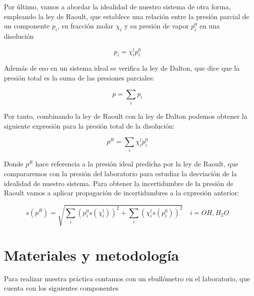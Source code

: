 \documentclass[a4paper,12pt,titlepage]{article}
\begin{document}
Por último, vamos a abordar la idealidad de nuestro sistema de otra forma, empleando la ley de Raoult, que establece una relación entre la presión parcial de un componente $p_i$, su fracción molar $\chi_i$ y su presión de vapor $p_i^0$ en una disolución

\begin{equation}
    p_i =\chi_i^l p_i^0  
\end{equation}

Además de eso en un sistema ideal se verifica la ley de Dalton, que dice que la presión total es la suma de las presiones parciales:

\begin{equation}
    p = \sum_i p_i
\end{equation}

Por tanto, combinando la ley de Raoult con la ley de Dalton podemos obtener la siguiente expresión para la presión total de la disolución:

\begin{equation}
    p^R = \sum_i \chi_i^l p_i^0
\end{equation}

Donde $p^R$ hace referencia a la presión ideal predicha por la ley de Raoult, que compararemos con la presión del laboratorio para estudiar la desviación de la idealidad de nuestro sistema. Para obtener la incertidumbre de la presión de Raoult vamos a aplicar propagación de incertidumbres a la expresión anterior:

\begin{equation}
    s(p^R) = \sqrt{ \sum_i \left(p_i^0 s(\chi_i^l)\right)^2  + \sum_i \left(\chi_i^l s(p_i^0)\right)^2} \quad i=OH,H_2O
\end{equation}

\section{Materiales y metodología}

Para realizar nuestra práctica contamos con un ebullómetro en el laboratorio, que cuenta con los siguientes componentes
\end{document}
